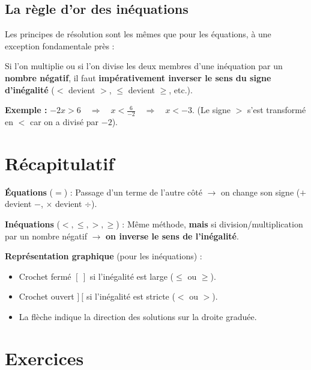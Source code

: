 \documentclass[../main.tex]{subfiles}
\begin{document}
\subsection{La règle d'or des inéquations}

Les principes de résolution sont les mêmes que pour les équations, à une exception fondamentale près :

\begin{attention}
Si l'on multiplie ou si l'on divise les deux membres d'une inéquation par un \textbf{nombre négatif}, il faut \textbf{impérativement inverser le sens du signe d'inégalité} ($<$ devient $>$, $\leq$ devient $\geq$, etc.).
\end{attention}

\textbf{Exemple :} 
$-2x > 6 \quad\Longrightarrow\quad x < \frac{6}{-2} \quad\Longrightarrow\quad x < -3$. 
(Le signe $>$ s'est transformé en $<$ car on a divisé par $-2$).

\section{Récapitulatif}

\begin{tcolorbox}[colback=gray!6,colframe=gray!60!black,title={\bfseries À retenir}]
\textbf{Équations} ($=$) : 
Passage d'un terme de l'autre côté $\rightarrow$ on change son signe ($+$ devient $-$, $\times$ devient $\div$).

\textbf{Inéquations} ($<, \leq, >, \geq$) : 
Même méthode, \textbf{mais} si division/multiplication par un nombre négatif $\rightarrow$ \textbf{on inverse le sens de l'inégalité}.

\textbf{Représentation graphique} (pour les inéquations) :
\begin{itemize}
  \item Crochet fermé $[\ ]$ si l'inégalité est large ($\leq$ ou $\geq$).
  \item Crochet ouvert $]\ [$ si l'inégalité est stricte ($<$ ou $>$).
  \item La flèche indique la direction des solutions sur la droite graduée.
\end{itemize}
\end{tcolorbox}

\newpage
\section{Exercices}
\end{document}
